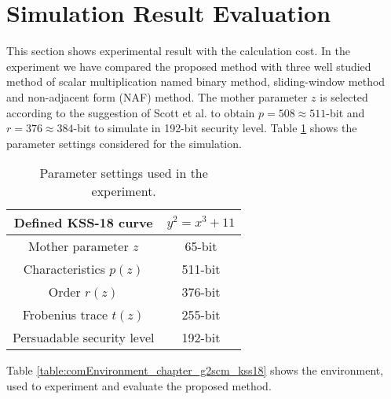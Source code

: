 \section{Simulation Result Evaluation}
This section shows experimental result with the calculation cost.
 In the experiment we have compared the proposed method with three well studied method of scalar multiplication named binary method, sliding-window method and non-adjacent form (NAF) method. 
The mother parameter $z$ is  selected according to the suggestion of Scott et al. \cite{IMA:Scott11} to obtain $p = 508 \approx 511$-bit and $r =  376 \approx 384$-bit  to simulate in 192-bit security level.
Table \ref{table:parameters_chapter_g2scm_kss18} shows the parameter settings considered for the simulation.

\renewcommand{\baselinestretch}{1.5}
\begin{table}[htb]
	\begin{center}
		\caption{Parameter settings used in the experiment.}
		\begin{tabular}{|c|c|}
			\hline
			Defined KSS-18 curve & $y^2 = x^3 + 11$ \\ \hline
			Mother parameter $z$ & 65-bit \\ \hline
			Characteristics  $p(z)$ & 511-bit \\ \hline
			Order  $r(z)$ & 376-bit \\ \hline
			Frobenius trace $t(z)$ & 255-bit \\ \hline
			Persuadable security level & 192-bit \\ \hline
		\end{tabular}
		\label{table:parameters_chapter_g2scm_kss18}
	\end{center}
\end{table}
\renewcommand{\baselinestretch}{1.0}

Table \ref{table:comEnvironment_chapter_g2scm_kss18} shows the environment, used to experiment and evaluate the proposed method.  
\renewcommand{\baselinestretch}{1.5}
\begin{table}[!ht]
\renewcommand{\arraystretch}{1.3}
\centering
\caption{ Computational environment.}
\label{table:comEnvironment_chapter_g2scm_kss18}
\end{table}
\renewcommand{\baselinestretch}{1.0}

